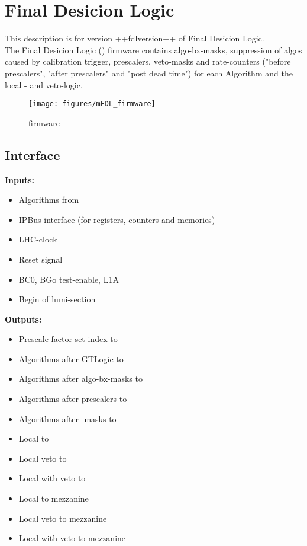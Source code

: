 \section{Final Desicion Logic}\label{sec:fdl:ufdl}

This description is for version ++fdlversion++ of Final Desicion Logic.\\

The Final Desicion Logic (\ufdl) firmware contains algo-bx-masks, suppression of algos caused by calibration trigger, prescalers, veto-masks and rate-counters
("before prescalers", "after prescalers" and "post dead time") for each Algorithm and the local \finor- and veto-logic.

\begin{figure}[htb]
\centering
\texttt{[image: figures/mFDL\_firmware]}
\caption{\ufdl firmware}
\label{fig:fdl:mFDL_firmware}
\end{figure}

\subsection{\ufdl Interface}
\label{sec:fdl:ufdl_interface}


\textbf{Inputs:}
\begin{itemize}
\item Algorithms from \ugtl
\item IPBus interface (for registers, counters and memories)
\item LHC-clock
\item Reset signal
\item BC0, BGo test-enable, L1A
\item Begin of lumi-section
\end{itemize}
\textbf{Outputs:}
\begin{itemize}
\item Prescale factor set index to \rop
\item Algorithms after GTLogic to \rop
\item Algorithms after algo-bx-masks to \rop
\item Algorithms after prescalers to \rop
\item Algorithms after \finor-masks to \rop
\item Local \finor to \rop
\item Local veto to \rop
\item Local \finor with veto to \rop
\item Local \finor to mezzanine
\item Local veto to mezzanine
\item Local \finor with veto to mezzanine
\end{itemize}

